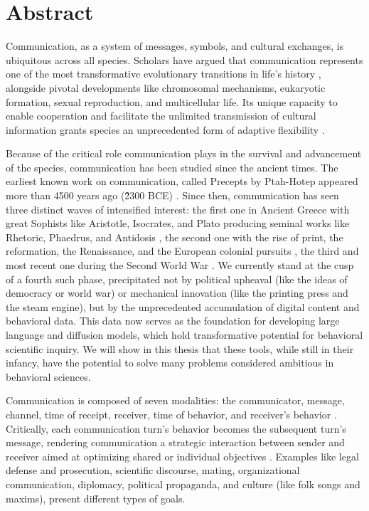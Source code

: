 \chapter*{Abstract}

Communication, as a system of messages, symbols, and cultural exchanges, is ubiquitous across all species.  Scholars have argued that communication represents one of the most transformative evolutionary transitions in life's history \cite{smith1997major}, alongside pivotal developments like chromosomal mechanisms, eukaryotic formation, sexual reproduction, and multicellular life. Its unique capacity to enable cooperation and facilitate the unlimited transmission of cultural information grants species an unprecedented form of adaptive flexibility \cite{kirby2008cumulative}.

Because of the critical role communication plays in the survival and advancement of the species, communication has been studied since the ancient times. The earliest known work on communication, called Precepts by Ptah-Hotep appeared more than 4500 years ago (\~2300 BCE) \cite{gray1946precepts}. Since then, communication has seen three distinct waves of intensified interest: the first one in Ancient Greece with great Sophists like Aristotle, Isocrates, and Plato producing seminal works like Rhetoric, Phaedrus, and Antidosis \cite{hackforth1972plato,rapp2002aristotle,norlin1928isocrates}, the second one with the rise of print, the reformation, the Renaissance, and the European colonial pursuits \cite{mack2011history}, the third and most recent one during the Second World War \cite{brinol2012history}. 
We currently stand at the cusp of a fourth such phase, precipitated not by political upheaval (like the ideas of democracy or world war) or mechanical innovation (like the printing press and the steam engine), but by the unprecedented accumulation of digital content and behavioral data. This data now serves as the foundation for developing large language and diffusion models, which hold transformative potential for behavioral scientific inquiry. We will show in this thesis that these tools, while still in their infancy, have the potential to solve many problems considered ambitious in behavioral sciences. 


Communication is composed of seven modalities: the communicator, message, channel, time of receipt, receiver, time of behavior, and receiver's behavior \cite{shannon-weaver-1949,lasswell1948structure,lasswell1971propaganda}. Critically, each communication turn's behavior becomes the subsequent turn's message, rendering communication a strategic interaction between sender and receiver aimed at optimizing shared or individual objectives \cite{smith2003animal}. Examples like legal defense and prosecution, scientific discourse, mating, organizational communication, diplomacy, political propaganda, and culture (like folk songs and maxims), present different types of goals.


